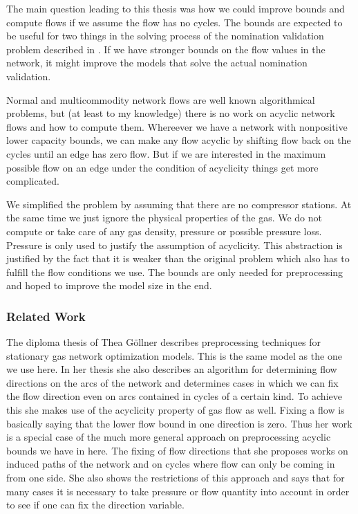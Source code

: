 The main question leading to this thesis was how we could improve bounds and compute flows if we assume the flow has no 
cycles. 
The bounds are expected to be useful for two things in the solving process of the nomination validation problem 
described in \cite{PfetschFuegenschuhGeissleretal.2012}. If we have stronger bounds on the flow values in the network, 
it might improve the models that solve the actual nomination validation. 


Normal and multicommodity network flows are well known algorithmical problems, but (at least to my 
knowledge) there is no work on acyclic network flows and how to compute them. 
Whereever we have a network with nonpositive lower capacity bounds, we can make any flow acyclic by shifting flow 
back on the cycles until an edge has zero flow. But if we are interested in the maximum possible flow on an edge under 
the condition of acyclicity things get more complicated. 

We simplified the problem by assuming that there are no compressor stations. At the same time we just ignore the 
physical properties of the gas. We do not compute or take care of any gas density, pressure or possible pressure loss. 
Pressure is only used to justify the assumption of acyclicity. This abstraction is justified by the fact that it is 
weaker than the original problem which also has to fulfill the flow conditions we use. The bounds are only needed 
for preprocessing and hoped to improve the model size in the end. 

\subsubsection{Related Work}
The diploma thesis of Thea Göllner \cite{DiplomarbeitTheaGoellner} describes preprocessing techniques for stationary gas 
network optimization models. This is the same model as the one we use here. In her thesis she also describes an 
algorithm for determining flow directions on the arcs of the network and determines cases in which we can fix the flow 
direction even on arcs contained in cycles of a certain kind. To achieve this she makes use of the acyclicity property 
of gas flow as well. 
Fixing a flow is basically saying that the lower flow bound in one direction is zero. Thus her work is a special case 
of the much more general approach on preprocessing acyclic bounds we have in here. The fixing of flow directions that 
she proposes works on induced paths of the network and on cycles where flow can only be coming in from one side. 
She also shows the restrictions of this approach and says that for many cases it is necessary to take pressure or flow 
quantity into account in order to see if one can fix the direction variable. 

